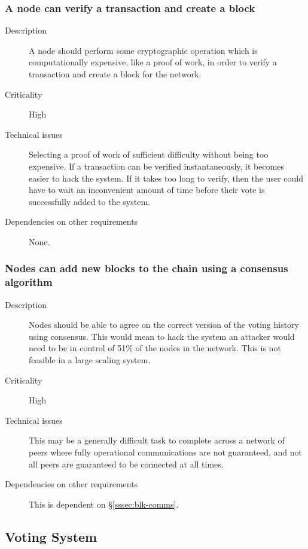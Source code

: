 \documentclass[a4paper,12pt]{article}
\begin{document}
\subsubsection{A node can verify a transaction and create a block}
\begin{description}
	\item[Description]
		A node should perform some cryptographic operation which is computationally expensive, like a proof of work, in order to verify a transaction and create a block for the network.
	\item[Criticality]
		High
	\item[Technical issues]
		Selecting a proof of work of sufficient difficulty without being too expensive. If a transaction can be verified instantaneously, it becomes easier to hack the system. If it takes too long to verify, then the user could have to wait an inconvenient amount of time before their vote is successfully added to the system.
	\item[Dependencies on other requirements]
		None.
\end{description}

\subsubsection{Nodes can add new blocks to the chain using a consensus algorithm}
\begin{description}
	\item[Description]
		Nodes should be able to agree on the correct version of the voting history using consensus. This would mean to hack the system an attacker would need to be in control of 51\% of the nodes in the network. This is not feasible in a large scaling system.
	\item[Criticality]
		High
	\item[Technical issues]
		This may be a generally difficult task to complete across a network of peers where fully operational communications are not guaranteed, and not all peers are guaranteed to be connected at all times.
	\item[Dependencies on other requirements]
		This is dependent on \S\ref{sssec:blk-comms}.
\end{description}

\subsection{Voting System}
\end{document}
